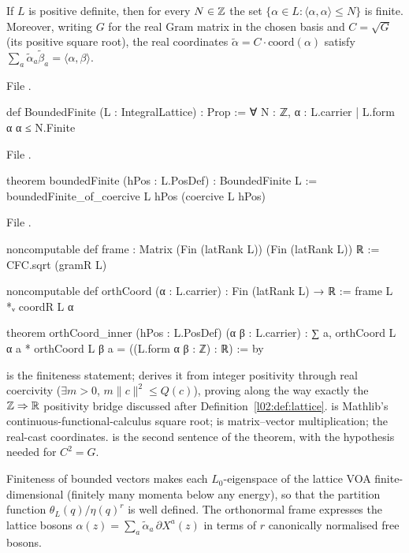 \begin{theorem}\label{l02:thm:bf}
If $L$ is positive definite, then for every $N\in{\mathbb{Z}}$ the set $\{\alpha\in L : \langle\alpha,\alpha\rangle\le N\}$ is
finite. Moreover, writing $G$ for the real Gram matrix in the chosen basis and $C = \sqrt G$ (its positive
square root), the real coordinates $\tilde\alpha = C\cdot\mathrm{coord}(\alpha)$ satisfy
$\sum_a\tilde\alpha_a\tilde\beta_a = \langle\alpha,\beta\rangle$.
\end{theorem}

File .
\begin{leancode}
def BoundedFinite (L : IntegralLattice) : Prop :=
  ∀ N : ℤ, {α : L.carrier | L.form α α ≤ N}.Finite
\end{leancode}
File .
\begin{leancode}
theorem boundedFinite (hPos : L.PosDef) : BoundedFinite L :=
  boundedFinite_of_coercive L hPos (coercive L hPos)
\end{leancode}
File .
\begin{leancode}
noncomputable def frame : Matrix (Fin (latRank L)) (Fin (latRank L)) ℝ := CFC.sqrt (gramR L)

noncomputable def orthCoord (α : L.carrier) : Fin (latRank L) → ℝ := frame L *ᵥ coordR L α

theorem orthCoord_inner (hPos : L.PosDef) (α β : L.carrier) :
    ∑ a, orthCoord L α a * orthCoord L β a = ((L.form α β : ℤ) : ℝ) := by
\end{leancode}

\begin{dictionary}
 is the finiteness statement;  derives it from integer
positivity through real coercivity ($\exists m>0$, $m\|c\|^2\le Q(c)$), proving along the way exactly the
${\mathbb{Z}}\Rightarrow\mathbb{R}$ positivity bridge discussed after Definition~\ref{l02:def:lattice}.  is
Mathlib's continuous-functional-calculus square root;  is matrix--vector multiplication;
 the real-cast coordinates.  is the second sentence of the
theorem, with the hypothesis  needed for $C^2 = G$.
\end{dictionary}

\begin{physics}
Finiteness of bounded vectors makes each $L_0$-eigenspace of the lattice VOA finite-dimensional
(finitely many momenta below any energy), so that the partition function
$\theta_L(q)/\eta(q)^r$ is well defined. The orthonormal frame expresses the lattice bosons
$\alpha(z) = \sum_a\tilde\alpha_a\,\partial X^a(z)$ in terms of $r$ canonically normalised free bosons.
\end{physics}

